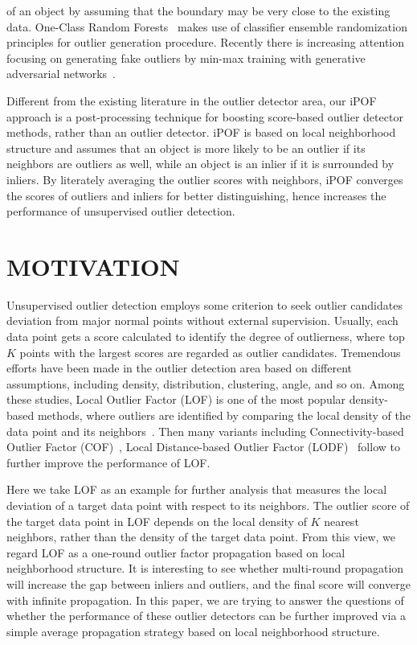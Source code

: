 \documentclass[sigconf,nonacm]{acmart}
\begin{document}
of an object by assuming that the boundary may be very close to the existing data. One-Class Random Forests~\textcolor{gray}{\cite{desir2013one}} makes use of classifier ensemble randomization principles for outlier generation procedure. Recently there is increasing attention focusing on generating fake outliers by min-max training with generative adversarial networks~\textcolor{gray}{\cite{liu2019generative,zenati2018efficient,li2018anomaly}}.

Different from the existing literature in the outlier detector area, our iPOF approach is a post-processing technique for boosting score-based outlier detector methods, rather than an outlier detector. iPOF is based on local neighborhood structure and assumes that an object is more likely to be an outlier if its neighbors are outliers as well, while an object is an inlier if it is surrounded by inliers. By literately averaging the outlier scores with neighbors, iPOF converges the scores of outliers and inliers for better distinguishing, hence increases the performance of unsupervised outlier detection.








\section{MOTIVATION}\label{sec:motivation}
Unsupervised outlier detection employs some criterion to seek outlier candidates deviation from major normal points without external supervision. Usually, each data point gets a score calculated to identify the degree of outlierness, where top $K$ points with the largest scores are regarded as outlier candidates. Tremendous efforts have been made in the outlier detection area based on different assumptions, including density, distribution, clustering, angle, and so on. Among these studies, Local Outlier Factor (LOF) is one of the most popular density-based methods, where outliers are identified by comparing the local density of the data point and its neighbors~\textcolor{gray}{\cite{Breunig00SIR}}. Then many variants including  Connectivity-based Outlier Factor (COF)~\textcolor{gray}{\cite{Tang02PKDD}}, Local Distance-based Outlier Factor (LODF)~\textcolor{gray}{\cite{Zhang09PKDD}} follow to further improve the performance of LOF. 

Here we take LOF as an example for further analysis that measures the local deviation of a target data point with respect to its neighbors. The outlier score of the target data point in LOF depends on the local density of $K$ nearest neighbors, rather than the density of the target data point. From this view, we regard LOF as a one-round outlier factor propagation based on local neighborhood structure. It is interesting to see whether multi-round propagation will increase the gap between inliers and outliers, and the final score will converge with infinite propagation. In this paper, we are trying to answer the questions of whether the performance of these outlier detectors can be further improved via a simple average propagation strategy based on local neighborhood structure.
\end{document}
